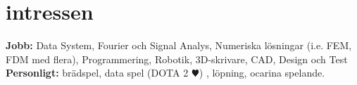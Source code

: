 \documentclass[]{friggeri-cv} %
\begin{document}






\newpage
\section{intressen}

\textbf{Jobb:} Data System, Fourier och Signal Analys, Numeriska lösningar (i.e. FEM, FDM med flera), Programmering, Robotik, 3D-skrivare, CAD, Design och Test \textbf{Personligt:} brädspel, data spel (DOTA 2{\color{red} $\varheartsuit$}) , löpning, ocarina spelande.  
\end{document}
